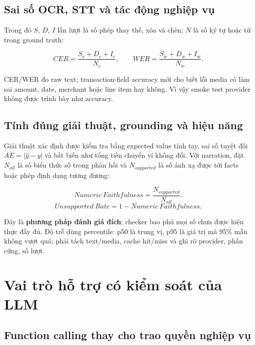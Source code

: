 \subsection{Sai số OCR, STT và tác động nghiệp vụ}

Trong đó $S$, $D$, $I$ lần lượt là số phép thay thế, xóa và chèn; $N$ là
số ký tự hoặc từ trong ground truth:

\begin{equation}
  CER=\frac{S_c+D_c+I_c}{N_c},\qquad
  WER=\frac{S_w+D_w+I_w}{N_w}.
\end{equation}

CER/WER đo raw text; transaction-field accuracy mới cho biết lỗi media
có làm sai amount, date, merchant hoặc line item hay không. Vì vậy
smoke test provider không được trình bày như accuracy.

\subsection{Tính đúng giải thuật, grounding và hiệu năng}

Giải thuật xác định được kiểm tra bằng expected value tính tay, sai số
tuyệt đối $AE=|\hat y-y|$ và bất biến như tổng tiền chuyển ví không đổi.
Với narration, đặt $N_{all}$ là số biểu thức số trong phản hồi và
$N_{supported}$ là số ánh xạ được tới facts hoặc phép định dạng tương
đương:

\begin{equation}
  Numeric\ Faithfulness=\frac{N_{supported}}{N_{all}}.
\end{equation}
\begin{equation}
  Unsupported\ Rate=1-Numeric\ Faithfulness.
\end{equation}

Đây là \textbf{phương pháp đánh giá đích}; checker bao phủ mọi số chưa
được hiện thực đầy đủ. Độ trễ dùng percentile: p50 là trung vị, p95 là
giá trị mà 95\% mẫu không vượt quá; phải tách text/media, cache hit/miss
và ghi rõ provider, phần cứng, số lượt.

\section{Vai trò hỗ trợ có kiểm soát của LLM}

\subsection{Function calling thay cho trao quyền nghiệp vụ}

